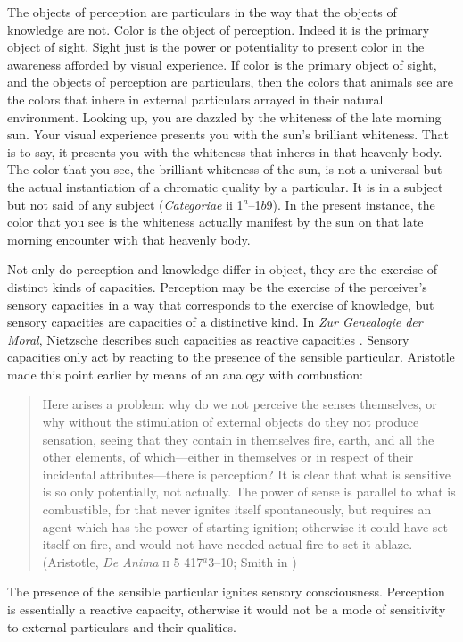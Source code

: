 The objects of perception are particulars in the way that the objects of knowledge are not. Color is the object of perception. Indeed it is the primary object of sight. Sight just is the power or potentiality to present color in the awareness afforded by visual experience. If color is the primary object of sight, and the objects of perception are particulars, then the colors that animals see are the colors that inhere in external particulars arrayed in their natural environment. Looking up, you are dazzled by the whiteness of the late morning sun. Your visual experience presents you with the sun's brilliant whiteness. That is to say, it presents you with the whiteness that inheres in that heavenly body. The color that you see, the brilliant whiteness of the sun, is not a universal but the actual instantiation of a chromatic quality by a particular. It is in a subject but not said of any subject (\emph{Categoriae} ii 1\( ^{a} \)--1\( b \)9). In the present instance, the color that you see is the whiteness actually manifest by the sun on that late morning encounter with that heavenly body.

Not only do perception and knowledge differ in object, they are the exercise of distinct kinds of capacities. Perception may be the exercise of the perceiver's sensory capacities in a way that corresponds to the exercise of knowledge, but sensory capacities are capacities of a distinctive kind. In \emph{Zur Genealogie der Moral}, Nietzsche  describes such capacities as reactive capacities \citep[for an illuminating discussion see][]{Deleuze:2006as}. Sensory capacities only act by reacting to the presence of the sensible particular. Aristotle made this point earlier by means of an analogy with combustion:
\begin{quote}
	Here arises a problem: why do we not perceive the senses themselves, or why without the stimulation of external objects do they not produce sensation, seeing that they contain in themselves fire, earth, and all the other elements, of which—either in themselves or in respect of their incidental attributes—there is perception? It is clear that what is sensitive is so only potentially, not actually. The power of sense is parallel to what is combustible, for that never ignites itself spontaneously, but requires an agent which has the power of starting ignition; otherwise it could have set itself on fire, and would not have needed actual fire to set it ablaze. (Aristotle, \emph{De Anima} \textsc{ii} 5 417\( ^{a} \)3--10; Smith in \citealt[29]{Barnes:1984uq})
\end{quote}
The presence of the sensible particular ignites sensory consciousness. Perception is essentially a reactive capacity, otherwise it would not be a mode of sensitivity to external particulars and their qualities.

